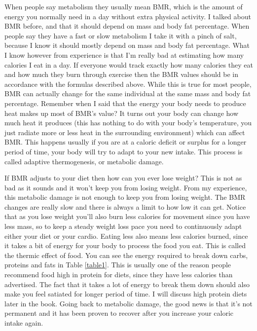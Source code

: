\documentclass[openany, 12pt]{book}
\begin{document}
	When people say metabolism they usually mean BMR, which is the amount of energy you normally need in a day without extra physical activity. I talked about BMR before, and 
	that it should depend on mass and body fat percentage. When people say they have a fast or slow metabolism I take it with a pinch of salt, because I know it should mostly depend
        on mass and body fat percentage. What I know however from experience is that I'm really bad at estimating how many calories I eat in a day. If everyone would track exactly how
        many calories they eat and how much they burn through exercise then the BMR values should be in accordance with the formulas described above. While this is true for most people,
        BMR can actually change for the same individual at the same mass and body fat percentage. Remember when I said that the energy your body needs to produce heat makes up most of
        BMR's value? It turns out your body can change how much heat it produces (this has nothing to do with your body's temperature, you just radiate more or less heat in the surrounding
        environment) which can affect BMR. This happens usually if you are at a caloric deficit or surplus for a longer period of time, your body will try to adapt to your new intake. This
        process is called adaptive thermogenesis, or metabolic damage.

        If BMR adjusts to your diet then how can you ever lose weight? This is not as bad as it sounds and it won't keep you from losing weight. From my experience, this metabolic damage is
        not enough to keep you from losing weight. The BMR changes are really slow and there is always a limit to how low it can get. Notice that as you lose weight you'll also burn less
        calories for movement since you have less mass, so to keep a steady weight loss pace you need to continuously adapt either your diet or your cardio. Eating less also means less
        calories burned, since it takes a bit of energy for your body to process the food you eat. This is called the thermic effect of food.
        You can see the energy required to break down carbs, proteins and
        fats in Table \ref{table1}. This is usually one of the reason people recommend food high in protein for diets, since they have less calories than advertised. The fact that it takes a lot of
        energy to break them down should also make you feel satiated for longer period of time. I will discuss high protein diets later in the book. 
        Going back to metabolic damage, the good news is that it's not permanent
        and it has been proven to recover after you increase your caloric intake again.
\end{document}

